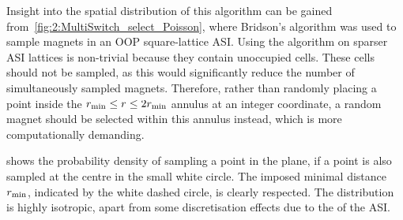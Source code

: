 Insight into the spatial distribution of this algorithm can be gained from~\cref{fig:2:MultiSwitch_select_Poisson}, where Bridson's algorithm was used to sample magnets in an OOP square-lattice ASI.
Using the algorithm on sparser ASI lattices is non-trivial because they contain unoccupied cells.
These cells should not be sampled, as this would significantly reduce the number of simultaneously sampled magnets.
Therefore, rather than randomly placing a point inside the $r_\mathrm{min} \leq r \leq 2 r_\mathrm{min}$ annulus at an integer coordinate, a random magnet should be selected within this annulus instead, which is more computationally demanding. \par
{} shows the probability density of sampling a point in the plane, if a point is also sampled at the centre in the small white circle.
The imposed minimal distance $r_\mathrm{min}$, indicated by the white dashed circle, is clearly respected.
The distribution is highly isotropic, apart from some discretisation effects due to the  of the ASI. \par


